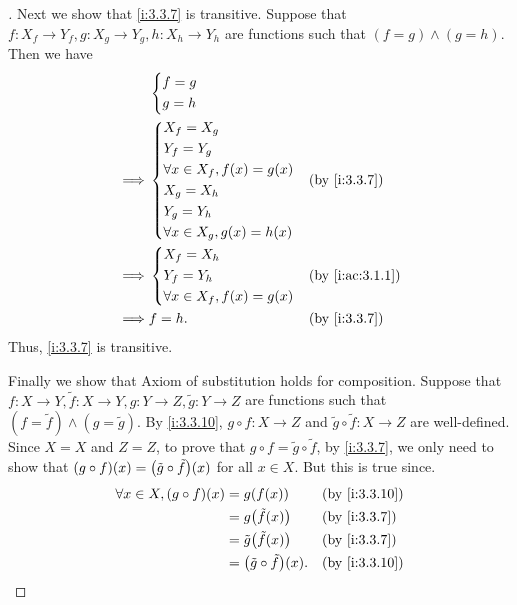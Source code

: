 \begin{proof}[]
  Next we show that \cref{i:3.3.7} is transitive.
  Suppose that \(f : X_f \to Y_f, g : X_g \to Y_g, h : X_h \to Y_h\) are functions such that \((f = g) \land (g = h)\).
  Then we have
  \begin{align*}
             & \begin{dcases}
                 f = g \\
                 g = h
               \end{dcases}                                       \\
    \implies & \begin{dcases}
                 X_f = X_g                      \\
                 Y_f = Y_g                      \\
                 \forall x \in X_f, f(x) = g(x) \\
                 X_g = X_h                      \\
                 Y_g = Y_h                      \\
                 \forall x \in X_g, g(x) = h(x)
               \end{dcases} &  & \by{i:3.3.7}                      \\
    \implies & \begin{dcases}
                 X_f = X_h \\
                 Y_f = Y_h \\
                 \forall x \in X_f, f(x) = g(x)
               \end{dcases}    &  & \by{i:ac:3.1.1}                \\
    \implies & f = h.                            &  & \by{i:3.3.7}
  \end{align*}
  Thus, \cref{i:3.3.7} is transitive.

  Finally we show that Axiom of substitution holds for composition.
  Suppose that \(f : X \to Y, \tilde{f} : X \to Y, g : Y \to Z, \tilde{g} : Y \to Z\) are functions such that \((f = \tilde{f}) \land (g = \tilde{g})\).
  By \cref{i:3.3.10}, \(g \circ f : X \to Z\) and \(\tilde{g} \circ \tilde{f} : X \to Z\) are well-defined.
  Since \(X = X\) and \(Z = Z\), to prove that \(g \circ f = \tilde{g} \circ \tilde{f}\), by \cref{i:3.3.7}, we only need to show that \((g \circ f)(x) = \pa{\tilde{g} \circ \tilde{f}}(x)\) for all \(x \in X\).
  But this is true since.
  \begin{align*}
    \forall x \in X, (g \circ f)(x) & = g(f(x))                            &  & \by{i:3.3.10} \\
                                    & = g\pa{\tilde{f}(x)}                 &  & \by{i:3.3.7}  \\
                                    & = \tilde{g}\pa{\tilde{f}(x)}         &  & \by{i:3.3.7}  \\
                                    & = \pa{\tilde{g} \circ \tilde{f}}(x). &  & \by{i:3.3.10}
  \end{align*}
\end{proof}

